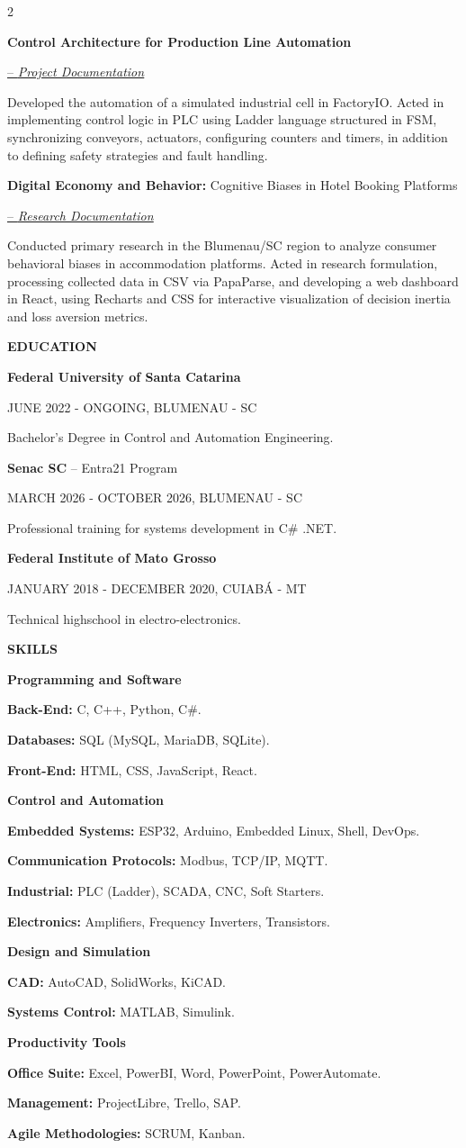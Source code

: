 \documentclass[10pt,a4paper]{article}
\newcommand{\titulo}[1]{
    \vspace{7pt}%
    {\noindent\sffamily\bfseries\fontsize{10pt}{10pt}\selectfont\textcolor{HeadingBlue}{#1}\par}
}
\newcommand{\subtitulo}[2]{
  \vspace{7pt}%
  {\noindent\rmfamily\fontsize{11pt}{12pt}\selectfont\textcolor{TitleBlack}{\textbf{#1}\textnormal{ #2}}\par}%
}
\newcommand{\data}[1]{
  \vspace{5pt}
  {\noindent\sffamily\fontsize{8pt}{9pt}\selectfont\textcolor{BodyGrey}{#1}\par}%
}
\newcommand{\textonormal}[2]{
  \vspace{5pt}%
  {\noindent\rmfamily\fontsize{9pt}{12pt}\selectfont\textcolor{BodyGrey}{\textbf{#1} #2}\par}%
}
\newcommand{\projectlink}[2]{
  \href{#1}{-- \textcolor{LinkBlue}{\normalfont\itshape\fontsize{11pt}{12pt}\selectfont\uline{#2}}}\par
}
\newcommand{\cvsection}[1]{%
  \titulo{#1}%
}
\newcommand{\cvedu}[5]{%
  \subtitulo{#1}{#2}
  \data{#3}
  \textonormal{#4}{#5}
}
\newcommand{\cvproject}[5]{%
  \begingroup
  \let\par\relax %
  \subtitulo{#1}{#2}%
  \projectlink{#3}{#4}%
  \endgroup\par %
  \textonormal{}{#5}
}
\newcommand{\cvskillgroup}[1]{%
  \subtitulo{#1}{}
}
\newcommand{\cvskill}[2]{%
  \textonormal{#1:}{#2}
}
\begin{document}
\begin{paracol}{2}
\cvproject{Control Architecture for Production Line Automation}{}{https://drive.google.com/drive/folders/1KUVhSGjqwdvy2c0Ng44Rv6noSsY3V96u?usp=sharing}{Project Documentation}{%
  Developed the automation of a simulated industrial cell in FactoryIO. Acted in implementing control logic in PLC using Ladder language structured in FSM, synchronizing conveyors, actuators, configuring counters and timers, in addition to defining safety strategies and fault handling.%
}

\cvproject{Digital Economy and Behavior:}{Cognitive Biases in Hotel Booking Platforms}{https://drive.google.com/drive/folders/1F2QMQNhS111xobrtduxpHqVYyy9-DDgK}{Research Documentation}{%
  Conducted primary research in the Blumenau/SC region to analyze consumer behavioral biases in accommodation platforms. Acted in research formulation, processing collected data in CSV via PapaParse, and developing a web dashboard in React, using Recharts and CSS for interactive visualization of decision inertia and loss aversion metrics.%
}

\switchcolumn

\cvsection{EDUCATION}

\cvedu{Federal University of Santa Catarina}{}{JUNE 2022 - ONGOING, BLUMENAU - SC}{}{%
  Bachelor's Degree in Control and Automation Engineering.%
}

\cvedu{Senac SC}{ -- Entra21 Program}{MARCH 2026 - OCTOBER 2026, BLUMENAU - SC}{}{%
  Professional training for systems development in C\# .NET.%
}

\cvedu{Federal Institute of Mato Grosso}{}{JANUARY 2018 - DECEMBER 2020, CUIABÁ - MT}{}{%
  Technical highschool in electro-electronics.%
}

\cvsection{SKILLS}

\cvskillgroup{Programming and Software}
\cvskill{Back-End}{C, C++, Python, C\#.}
\cvskill{Databases}{SQL (MySQL, MariaDB, SQLite).}
\cvskill{Front-End}{HTML, CSS, JavaScript, React.}

\cvskillgroup{Control and Automation}
\cvskill{Embedded Systems}{ESP32, Arduino, Embedded Linux, Shell, DevOps.}
\cvskill{Communication Protocols}{Modbus, TCP/IP, MQTT.}
\cvskill{Industrial}{PLC (Ladder), SCADA, CNC, Soft Starters.}
\cvskill{Electronics}{Amplifiers, Frequency Inverters, Transistors.}

\cvskillgroup{Design and Simulation}
\cvskill{CAD}{AutoCAD, SolidWorks, KiCAD.}
\cvskill{Systems Control}{MATLAB, Simulink.}

\cvskillgroup{Productivity Tools}
\cvskill{Office Suite}{Excel, PowerBI, Word, PowerPoint, PowerAutomate.}
\cvskill{Management}{ProjectLibre, Trello, SAP.}
\cvskill{Agile Methodologies}{SCRUM, Kanban.}


\end{paracol}
\end{document}
